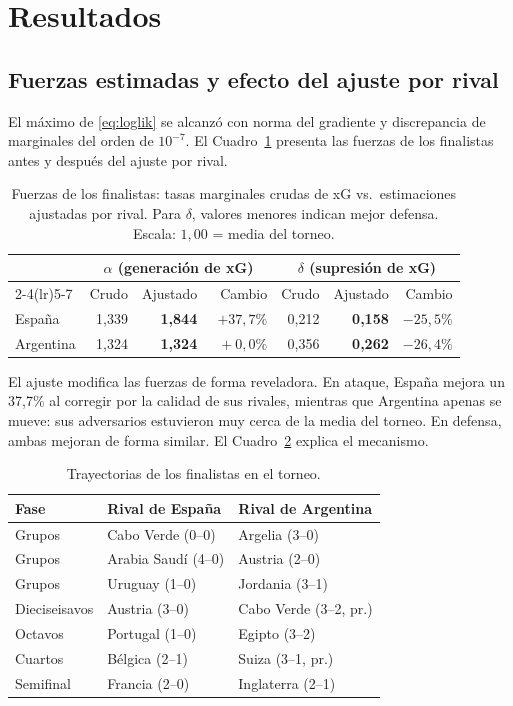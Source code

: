 \documentclass[11pt,a4paper]{article}
\begin{document}
\section{Resultados}

\subsection{Fuerzas estimadas y efecto del ajuste por rival}

El máximo de \eqref{eq:loglik} se alcanzó con norma del gradiente y discrepancia de marginales del orden de $10^{-7}$. El Cuadro~\ref{tab:fuerzas} presenta las fuerzas de los finalistas antes y después del ajuste por rival.

\begin{table}[htbp]
\centering
\caption{Fuerzas de los finalistas: tasas marginales crudas de xG vs.\ estimaciones ajustadas por rival. Para $\delta$, valores menores indican mejor defensa. Escala: $1{,}00$ = media del torneo.}
\label{tab:fuerzas}
\begin{tabular}{lrrrrrr}
\toprule
& \multicolumn{3}{c}{$\alpha$ (generación de xG)} & \multicolumn{3}{c}{$\delta$ (supresión de xG)} \\
\cmidrule(lr){2-4}\cmidrule(lr){5-7}
& Crudo & Ajustado & Cambio & Crudo & Ajustado & Cambio \\
\midrule
España    & 1{,}339 & \textbf{1{,}844} & $+37{,}7\%$ & 0{,}212 & \textbf{0{,}158} & $-25{,}5\%$ \\
Argentina & 1{,}324 & \textbf{1{,}324} & $\phantom{0}+0{,}0\%$ & 0{,}356 & \textbf{0{,}262} & $-26{,}4\%$ \\
\bottomrule
\end{tabular}
\end{table}

El ajuste modifica las fuerzas de forma reveladora. En ataque, España mejora un 37{,}7\% al corregir por la calidad de sus rivales, mientras que Argentina apenas se mueve: sus adversarios estuvieron muy cerca de la media del torneo. En defensa, ambas mejoran de forma similar. El Cuadro~\ref{tab:caminos} explica el mecanismo.

\begin{table}[htbp]
\centering
\caption{Trayectorias de los finalistas en el torneo.}
\label{tab:caminos}
\begin{tabular}{lll}
\toprule
\textbf{Fase} & \textbf{Rival de España} & \textbf{Rival de Argentina} \\
\midrule
Grupos & Cabo Verde (0--0) & Argelia (3--0) \\
Grupos & Arabia Saudí (4--0) & Austria (2--0) \\
Grupos & Uruguay (1--0) & Jordania (3--1) \\
Dieciseisavos & Austria (3--0) & Cabo Verde (3--2, pr.) \\
Octavos & Portugal (1--0) & Egipto (3--2) \\
Cuartos & Bélgica (2--1) & Suiza (3--1, pr.) \\
Semifinal & Francia (2--0) & Inglaterra (2--1) \\
\bottomrule
\end{tabular}
\end{table}
\end{document}
